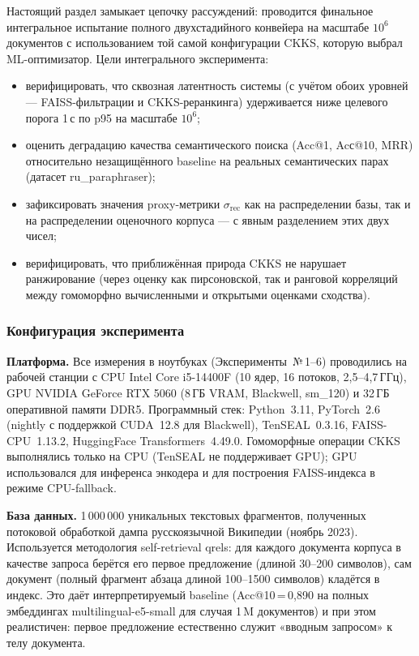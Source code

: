 \documentclass[a4paper, 12pt, oneside, openany]{article}
\begin{document}
Настоящий раздел замыкает цепочку рассуждений: проводится финальное интегральное испытание полного двухстадийного конвейера на масштабе $10^{6}$ документов с использованием той самой конфигурации CKKS, которую выбрал ML-оптимизатор. Цели интегрального эксперимента:
\begin{itemize}
	\item верифицировать, что сквозная латентность системы (с учётом обоих уровней --- FAISS-фильтрации и CKKS-реранкинга) удерживается ниже целевого порога 1\,с по p95 на масштабе $10^{6}$;
	\item оценить деградацию качества семантического поиска (Acc@1, Acс@10, MRR) относительно незащищённого baseline на реальных семантических парах (датасет ru\_paraphraser);
	\item зафиксировать значения proxy-метрики $\sigma_{\mathrm{rec}}$ как на распределении базы, так и на распределении оценочного корпуса --- с явным разделением этих двух чисел;
	\item верифицировать, что приближённая природа CKKS не нарушает ранжирование (через оценку как пирсоновской, так и ранговой корреляций между гомоморфно вычисленными и открытыми оценками сходства).
\end{itemize}

\subsubsection{Конфигурация эксперимента}

\textbf{Платформа.} Все измерения в ноутбуках (Эксперименты~№\,1--6) проводились на рабочей станции с CPU Intel Core i5-14400F (10 ядер, 16 потоков, 2,5--4,7\,ГГц), GPU NVIDIA GeForce RTX 5060 (8\,ГБ VRAM, Blackwell, sm\_120) и 32\,ГБ оперативной памяти DDR5. Программный стек: Python~3.11, PyTorch~2.6 (nightly с поддержкой CUDA~12.8 для Blackwell), TenSEAL~0.3.16, FAISS-CPU~1.13.2, HuggingFace Transformers~4.49.0. Гомоморфные операции CKKS выполнялись только на CPU (TenSEAL не поддерживает GPU); GPU использовался для инференса энкодера и для построения FAISS-индекса в режиме CPU-fallback.

\textbf{База данных.} 1\,000\,000 уникальных текстовых фрагментов, полученных потоковой обработкой дампа русскоязычной Википедии (ноябрь 2023). Используется методология self-retrieval qrels: для каждого документа корпуса в качестве запроса берётся его первое предложение (длиной 30--200 символов), сам документ (полный фрагмент абзаца длиной 100--1500 символов) кладётся в индекс. Это даёт интерпретируемый baseline (Acc@10\,=\,0,890 на полных эмбеддингах multilingual-e5-small для случая 1\,M документов) и при этом реалистичен: первое предложение естественно служит «вводным запросом» к телу документа.
\end{document}
